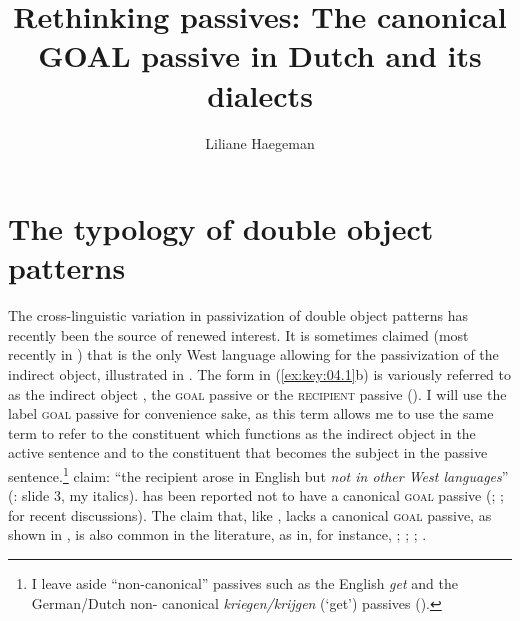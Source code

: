 \documentclass[output=paper]{langsci/langscibook}
\author{Liliane Haegeman\affiliation{Ghent University}}
\title{Rethinking passives: The canonical GOAL passive in Dutch and its
dialects}
\begin{document}
\glsresetall

\section{The typology of double object patterns}\label{sec:key:04.1}

The cross-linguistic variation in passivization of double object patterns has
recently been the source of renewed interest. It
is sometimes claimed (most recently in \citealt{SteinTripsIngham2016}) that
 is the only West  language allowing for the passivization
of the indirect object, illustrated in . The 
form in (\ref{ex:key:04.1}b) is variously referred to as the indirect object
, the \textsc{goal} passive
\parencite{HaddicanHolmberg2012,HaddicanHolmberg2015}
or the \textsc{recipient} passive (\citealt{SteinTripsIngham2016}). I will use
the label \textsc{goal} passive for convenience sake, as this term allows me to
use the same term to refer to the constituent which functions as the indirect
object in the active sentence and to the constituent that becomes the subject
in the passive sentence.\footnote{I leave aside \enquote{non-canonical}
passives such as the English \emph{get}  and the German/Dutch non-
canonical \emph{kriegen/krijgen} (‘get’) passives (\citealt{AleScha2013}).}
\citeauthor{SteinTripsIngham2016} claim: “the recipient  arose in
English but \emph{not in other West  languages}”
(\citeyear{SteinTripsIngham2016}: slide 3, my italics).  has been
reported not to have a canonical \textsc{goal} passive 
(\citet[70]{Anagnostopoulou2003}; \citet[9]{AleScha2013};
\citet[10]{Aleetal2014} for recent discussions). The claim that, like
,  lacks a canonical \textsc{goal} passive, as shown in
, is also common in the literature, as in, for instance,
\textcite{BroekhuisCornips2004,BroekhuisCornips2012};
\textcite{Broekhuisetal2015}; \citet[8]{AleScha2013};
\textcite[10]{Aleetal2014}.

\ea\label{ex:key:04.1} \textcite{HaddicanHolmberg2012,HaddicanHolmberg2015}
    \z
\z

\ea\label{ex:key:04.2}  \parencite[10]{Aleetal2014}
    \z
\z
\end{document}
